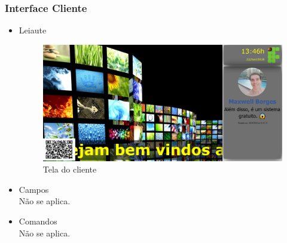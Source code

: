     \subsubsection{Interface Cliente}
        \begin{itemize}
        \item Leiaute
            \begin{figure}[H]
                \centering
                \includegraphics[width=\textwidth]{figuras/telacliente}
                \caption{Tela do cliente}
            \end{figure}
        \item Campos\\
            Não se aplica.
        \item Comandos\\
            Não se aplica.
        \end{itemize}